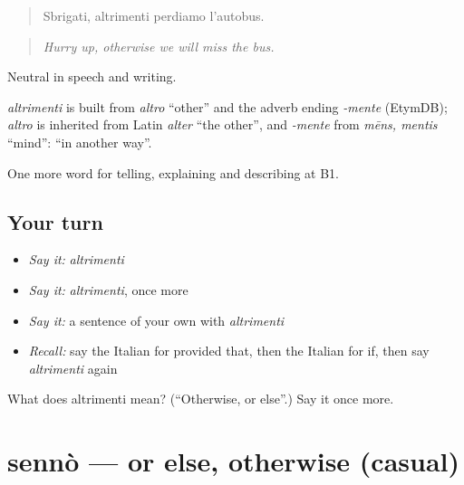 \begin{quote}
Sbrigati, altrimenti perdiamo l'autobus.
\end{quote}

\begin{quote}
\emph{Hurry up, otherwise we will miss the bus.}
\end{quote}

Neutral in speech and writing.

\begin{cousinweb}
\emph{altrimenti} is built from \emph{altro} \textquotedblleft{}other\textquotedblright{} and the adverb ending \emph{-mente} (EtymDB); \emph{altro} is inherited from Latin \emph{alter} \textquotedblleft{}the other\textquotedblright{}, and \emph{-mente} from \emph{mēns, mentis} \textquotedblleft{}mind\textquotedblright{}: \textquotedblleft{}in another way\textquotedblright{}.
\end{cousinweb}

\begin{grammarlens}[title={What you've built}]
One more word for telling, explaining and describing at B1.
\end{grammarlens}

\subsection*{Your turn}
\begin{itemize}
\raggedright
  \item \emph{Say it:} \emph{altrimenti}
  \item \emph{Say it:} \emph{altrimenti}, once more
  \item \emph{Say it:} a sentence of your own with \emph{altrimenti}
  \item \emph{Recall:} say the Italian for provided that, then the Italian for if, then say \emph{altrimenti} again
\end{itemize}

\begin{tcolorbox}[breakable,colback=teal!4,colframe=teal!35!black,title={Before you move on}]
What does altrimenti mean? (\textquotedblleft{}Otherwise, or else\textquotedblright{}.) Say it once more.
\end{tcolorbox}
\section[sennò]{sennò — or else, otherwise (casual)}

\label{lesson:IT-C373-senno}



